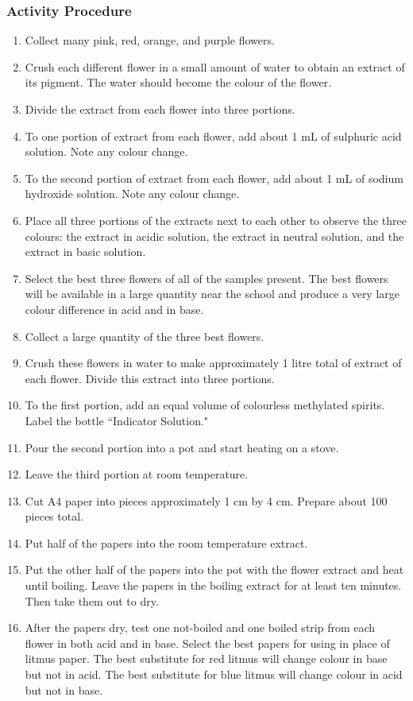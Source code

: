 \subsubsection*{Activity Procedure}
\begin{enumerate}
\item{Collect many pink, red, orange, and purple flowers.}
\item{Crush each different flower in a small amount of water to obtain an extract of its pigment. The water should become the colour of the flower.}
\item{Divide the extract from each flower into three portions.}
\item{To one portion of extract from each flower, add about 1 mL of sulphuric acid solution. Note any colour change.}
\item{To the second portion of extract from each flower, add about 1 mL of sodium hydroxide solution. Note any colour change.}
\item{Place all three portions of the extracts next to each other to observe the three colours: the extract in acidic solution, the extract in neutral solution, and the extract in basic solution.}
\item{Select the best three flowers of all of the samples present. The best flowers will be available in a large quantity near the school and produce a very large colour difference in acid and in base.}
\item{Collect a large quantity of the three best flowers.}
\item{Crush these flowers in water to make approximately 1 litre total of extract of each flower. Divide this extract into three portions.}
\item{To the first portion, add an equal volume of colourless methylated spirits. Label the bottle ``Indicator Solution."}
\item{Pour the second portion into a pot and start heating on a stove.}
\item{Leave the third portion at room temperature.}
\item{Cut A4 paper into pieces approximately 1 cm by 4 cm. Prepare about 100 pieces total.}
\item{Put half of the papers into the room temperature extract.}
\item{Put the other half of the papers into the pot with the flower extract and heat until boiling. Leave the papers in the boiling extract for at least ten minutes. Then take them out to dry.}
\item{After the papers dry, test one not-boiled and one boiled strip from each flower in both acid and in base. Select the best papers for using in place of litmus paper. The best substitute for red litmus will change colour in base but not in acid. The best substitute for blue litmus will change colour in acid but not in base.}
\end{enumerate}

